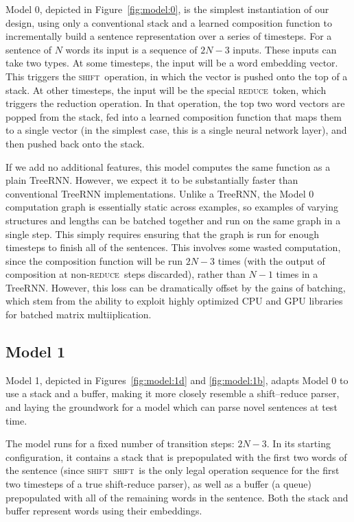 \documentclass[11pt,letterpaper]{article}
\newcommand{\shift}{\textsc{shift}}
\newcommand{\reduce}{\textsc{reduce}}
\begin{document}
Model 0, depicted in Figure~\ref{fig:model:0}, is the simplest instantiation of our design, using only a conventional stack and a learned composition function to incrementally build a sentence representation over a series of timesteps. For a sentence of $N$ words its input is a sequence of $2N-3$ inputs. These inputs can take two types. At some timesteps, the input will be a word embedding vector. This triggers the \shift~operation, in which the vector is pushed onto the top of a stack. At other timesteps, the input will be the special \reduce~token, which triggers the reduction operation. In that operation, the top two word vectors are popped from the stack, fed into a learned composition function that maps them to a single vector (in the simplest case, this is a single neural network layer), and then pushed back onto the stack.

If we add no additional features, this model computes the same function as a plain TreeRNN. However, we expect it to be substantially faster than conventional TreeRNN implementations. Unlike a TreeRNN, the Model 0 computation graph is essentially static across examples, so examples of varying structures and lengths can be batched together and run on the same graph in a single step. This simply requires ensuring that the graph is run for enough timesteps to finish all of the sentences. This involves some wasted computation, since the composition function will be run $2N-3$ times (with the output of composition at non-\reduce~steps discarded), rather than $N-1$ times in a TreeRNN. However, this loss can be dramatically offset by the gains of batching, which stem from the ability to exploit highly optimized CPU and GPU libraries for batched matrix multiiplication.

\subsection{Model 1}



Model 1, depicted in Figures~\ref{fig:model:1d} and \ref{fig:model:1b}, adapts Model 0 to use a stack and a buffer, making it more closely resemble a shift--reduce parser, and laying the groundwork for a model which can parse novel sentences at test time.

The model runs for a fixed number of transition steps: $2N - 3$. In its starting configuration, it contains a stack that is prepopulated with the first two words of the sentence (since \shift~\shift~is the only legal operation sequence for the first two timesteps of a true shift-reduce parser), as well as a buffer (a queue) prepopulated with all of the remaining words in the sentence. Both the stack and buffer represent words using their embeddings. 
\end{document}
